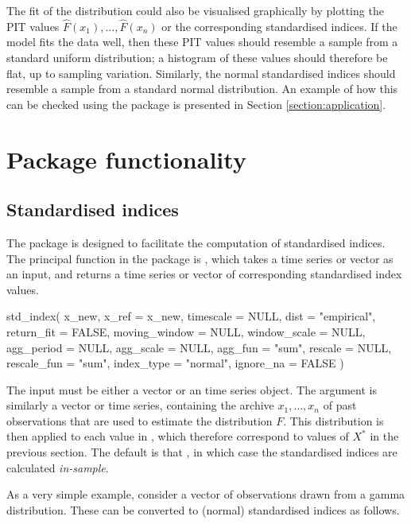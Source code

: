 \documentclass[article,shortnames,nojss]{jss}\usepackage[]{graphicx}\usepackage[]{xcolor}
\begin{document}
The fit of the distribution could also be visualised graphically by plotting the PIT values $\hat{F}(x_{1}), \dots, \hat{F}(x_{n})$ or the corresponding standardised indices. If the model fits the data well, then these PIT values should resemble a sample from a standard uniform distribution; a histogram of these values should therefore be flat, up to sampling variation. Similarly, the normal standardised indices should resemble a sample from a standard normal distribution. An example of how this can be checked using the  package is presented in Section \ref{section:application}.


\section{Package functionality}\label{section:functionality}

\subsection{Standardised indices}

The  package is designed to facilitate the computation of standardised indices. The principal function in the package is , which takes a time series or vector  as an input, and returns a time series or vector of corresponding standardised index values.

\begin{Code}
std_index(
  x_new,
  x_ref = x_new,
  timescale = NULL,
  dist = "empirical",
  return_fit = FALSE,
  moving_window = NULL,
  window_scale = NULL,
  agg_period = NULL,
  agg_scale = NULL,
  agg_fun = "sum",
  rescale = NULL,
  rescale_fun = "sum",
  index_type = "normal",
  ignore_na = FALSE
)
\end{Code}

The input  must be either a vector or an  time series object. The argument  is similarly a vector or time series, containing the archive $x_{1}, \dots, x_{n}$ of past observations that are used to estimate the distribution $F$. This distribution is then applied to each value in , which therefore correspond to values of $X^{*}$ in the previous section. The default is that , in which case the standardised indices are calculated \emph{in-sample}.

As a very simple example, consider a vector of observations drawn from a gamma distribution. These can be converted to (normal) standardised indices as follows.
\end{document}
